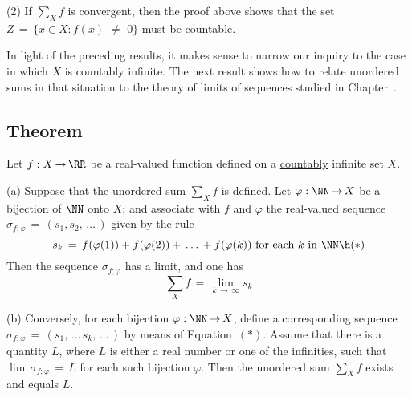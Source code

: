 \V

        (2) If ${\sum}_{X} f$ is convergent, then the proof above shows that the set $Z \,=\, \{x{\in}X: f(x) \,\,{\neq}\,\, 0\}$ must be countable.


\V
\V


    In light of the preceding results, it makes sense to narrow our inquiry to the case in which $X$ is countably infinite.
    The next result shows how to relate unordered sums in that situation to the theory of limits of sequences studied in Chapter~.

\V
\V

            \subsection{\small{\bf Theorem}}
            \label{ThmG20.120}

        Let $f:X \,{\rightarrow}\, {\RR}$ be a real-valued function defined on a \underline{countably} infinite set $X$.

\V


    (a) Suppose that the unordered sum $\sum_{X} f$ is defined.
    Let ${\varphi}:{\NN} \,{\rightarrow}\, X$ be a bijection of ${\NN}$ onto $X$;
    and associate with $f$ and ${\varphi}$ the real-valued sequence ${\sigma}_{f;{\varphi}} \,=\, (s_{1},s_{2},\,{\ldots}\,)$ given by the rule
        \begin{displaymath}
        s_{k} \,=\, f({\varphi}(1)) + f({\varphi}(2)) + \,{\ldots}\,+ f({\varphi}(k)) \mbox{ for each $k$ in ${\NN}$} \h ({\ast})
        \end{displaymath}
    Then the sequence ${\sigma}_{f;{\varphi}}$ has a limit, and one has
        \begin{equation}
        \label{EqnG.50}
        {\sum}_{X} f \,=\, \lim_{k \,{\rightarrow}\, {\infty}} s_{k}
        \end{equation}

\V

        (b) Conversely, for each bijection ${\varphi}:{\NN} \,{\rightarrow}\, X$,
    define a corresponding sequence ${\sigma}_{f;{\varphi}} \,=\, (s_{1},\,{\ldots}\,s_{k},\,{\ldots}\,)$ by means of Equation~$({\ast})$. 
    Assume that there is a quantity $L$, where $L$ is either a real number or one of the infinities, 
    such that $\lim\, {\sigma}_{f;{\varphi}} \,=\, L$ for each such bijection ${\varphi}$.
    Then the unordered sum $\sum_{X} f$ exists and equals $L$.

\V


